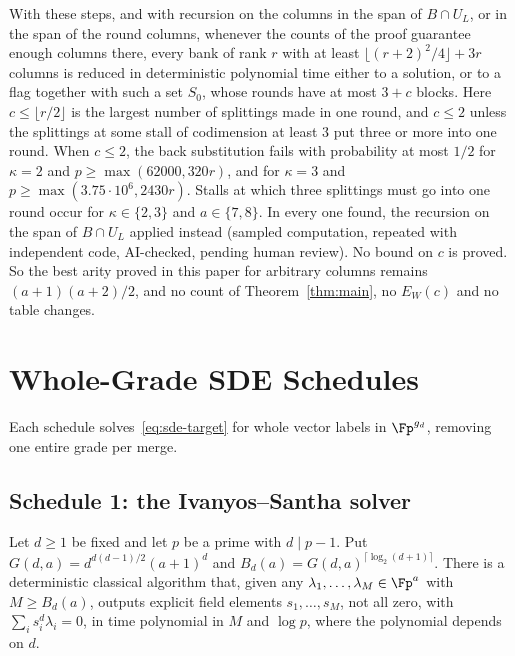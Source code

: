 \begin{remark}
With these steps, and with recursion on the columns in the span of $B\cap U_L$, or in the span of the round columns, whenever the counts of the proof guarantee enough columns there, every bank of rank $r$ with at least $\lfloor(r+2)^2/4\rfloor+3r$ columns is reduced in deterministic polynomial time either to a solution, or to a flag together with such a set $S_0$, whose rounds have at most $3+c$ blocks. Here $c\le\lfloor r/2\rfloor$ is the largest number of splittings made in one round, and $c\le2$ unless the splittings at some stall of codimension at least $3$ put three or more into one round. When $c\le2$, the back substitution fails with probability at most $1/2$ for $\kappa=2$ and $p\ge\max(62000,320r)$, and for $\kappa=3$ and $p\ge\max(3.75\cdot10^6,2430r)$. Stalls at which three splittings must go into one round occur for $\kappa\in\{2,3\}$ and $a\in\{7,8\}$. In every one found, the recursion on the span of $B\cap U_L$ applied instead (sampled computation, repeated with independent code, AI-checked, pending human review). No bound on $c$ is proved. So the best arity proved in this paper for arbitrary columns remains $(a+1)(a+2)/2$, and no count of Theorem~\ref{thm:main}, no $E_W(c)$ and no table changes.
\end{remark}

\section{Whole-Grade SDE Schedules}
\label{sec:schedules}

Each schedule solves~\eqref{eq:sde-target} for whole vector labels in $\Fp^{g_d}$, removing one entire grade per merge.

\subsection{Schedule 1: the Ivanyos--Santha solver}
\label{sec:schedule1}

\begin{theorem}
\label{thm:is-import}
Let $d \ge 1$ be fixed and let $p$ be a prime with $d \mid p-1$. Put $G(d,a) = d^{d(d-1)/2}(a+1)^d$ and $B_d(a) = G(d,a)^{\lceil\log_2(d+1)\rceil}$. There is a deterministic classical algorithm that, given any $\lambda_1,\dots,\lambda_M \in \Fp^a$ with $M \ge B_d(a)$, outputs explicit field elements $s_1,\dots,s_M$, not all zero, with $\sum_{i} s_i^d\lambda_i = 0$, in time polynomial in $M$ and $\log p$, where the polynomial depends on $d$.
\end{theorem}

